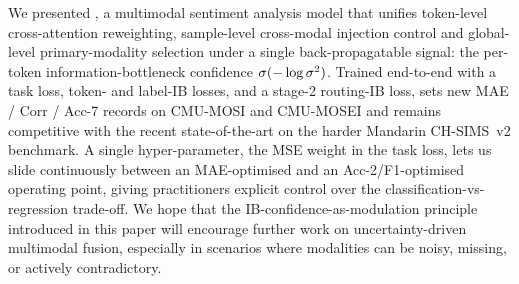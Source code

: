 We presented \methodname{}, a multimodal sentiment analysis model that
unifies token-level cross-attention reweighting, sample-level
cross-modal injection control and global-level primary-modality
selection under a single back-propagatable signal: the per-token
information-bottleneck confidence $\sigma(-\log\sigma^{2})$.
Trained end-to-end with a task loss, token- and label-IB losses, and
a stage-2 routing-IB loss, \methodname{} sets new MAE / Corr / Acc-7
records on \textsc{CMU-MOSI} and \textsc{CMU-MOSEI} and remains
competitive with the recent state-of-the-art on the harder Mandarin
\textsc{CH-SIMS}~v2 benchmark.
A single hyper-parameter, the MSE weight in the task loss, lets us
slide continuously between an MAE-optimised and an Acc-2/F1-optimised
operating point, giving practitioners explicit control over the
classification-vs-regression trade-off.
We hope that the IB-confidence-as-modulation principle introduced in
this paper will encourage further work on uncertainty-driven
multimodal fusion, especially in scenarios where modalities can be
noisy, missing, or actively contradictory.
